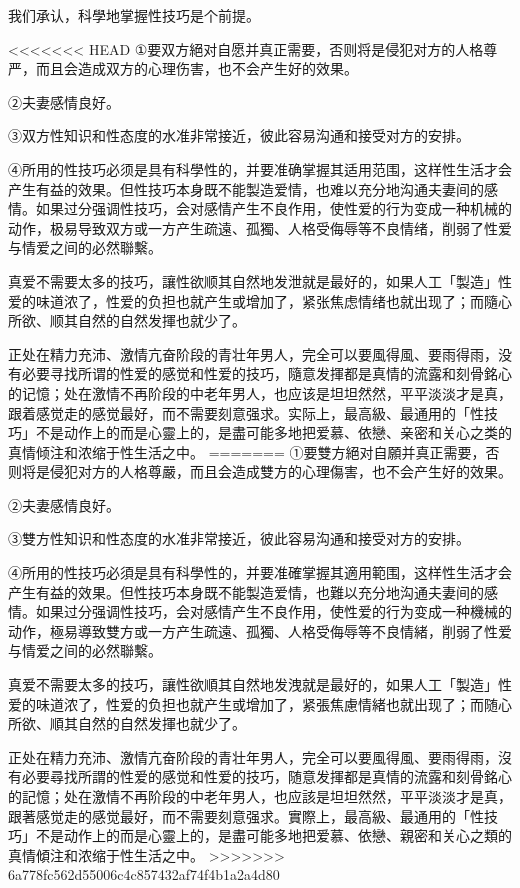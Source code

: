 \documentclass[12pt,UTF8]{ctexbook}
\begin{document}
我们承认，科學地掌握性技巧是个前提。

<<<<<<< HEAD
①要双方絕对自愿并真正需要，否则将是侵犯对方的人格尊严，而且会造成双方的心理伤害，也不会产生好的效果。

②夫妻感情良好。

③双方性知识和性态度的水准非常接近，彼此容易沟通和接受对方的安排。

④所用的性技巧必须是具有科學性的，并要准确掌握其适用范围，这样性生活才会产生有益的效果。但性技巧本身既不能製造爱情，也难以充分地沟通夫妻间的感情。如果过分强调性技巧，会对感情产生不良作用，使性爱的行为变成一种机械的动作，极易导致双方或一方产生疏遠、孤獨、人格受侮辱等不良情绪，削弱了性爱与情爱之间的必然聯繫。

真爱不需要太多的技巧，讓性欲顺其自然地发泄就是最好的，如果人工「製造」性爱的味道浓了，性爱的负担也就产生或增加了，紧张焦虑情绪也就出现了；而隨心所欲、顺其自然的自然发揮也就少了。

正处在精力充沛、激情亢奋阶段的青壮年男人，完全可以要風得風、要雨得雨，没有必要寻找所谓的性爱的感觉和性爱的技巧，隨意发揮都是真情的流露和刻骨銘心的记憶；处在激情不再阶段的中老年男人，也应该是坦坦然然，平平淡淡才是真，跟着感觉走的感觉最好，而不需要刻意强求。实际上，最高級、最通用的「性技巧」不是动作上的而是心靈上的，是盡可能多地把爱慕、依戀、亲密和关心之类的真情倾注和浓缩于性生活之中。
=======
①要雙方絕对自願并真正需要，否则将是侵犯对方的人格尊嚴，而且会造成雙方的心理傷害，也不会产生好的效果。

②夫妻感情良好。

③雙方性知识和性态度的水准非常接近，彼此容易沟通和接受对方的安排。

④所用的性技巧必須是具有科學性的，并要准確掌握其適用範围，这样性生活才会产生有益的效果。但性技巧本身既不能製造爱情，也難以充分地沟通夫妻间的感情。如果过分强调性技巧，会对感情产生不良作用，使性爱的行为变成一种機械的动作，極易導致雙方或一方产生疏遠、孤獨、人格受侮辱等不良情緒，削弱了性爱与情爱之间的必然聯繫。

真爱不需要太多的技巧，讓性欲順其自然地发洩就是最好的，如果人工「製造」性爱的味道浓了，性爱的负担也就产生或增加了，紧張焦慮情緒也就出现了；而随心所欲、順其自然的自然发揮也就少了。

正处在精力充沛、激情亢奋阶段的青壮年男人，完全可以要風得風、要雨得雨，沒有必要尋找所謂的性爱的感觉和性爱的技巧，随意发揮都是真情的流露和刻骨銘心的記憶；处在激情不再阶段的中老年男人，也应該是坦坦然然，平平淡淡才是真，跟著感觉走的感觉最好，而不需要刻意强求。實際上，最高級、最通用的「性技巧」不是动作上的而是心靈上的，是盡可能多地把爱慕、依戀、親密和关心之類的真情傾注和浓缩于性生活之中。
>>>>>>> 6a778fc562d55006c4c857432af74f4b1a2a4d80
\end{document}
